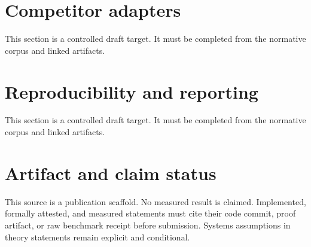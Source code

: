 \documentclass[11pt]{article}
\begin{document}
\section{Competitor adapters}
This section is a controlled draft target. It must be completed from the normative corpus and linked artifacts.

\section{Reproducibility and reporting}
This section is a controlled draft target. It must be completed from the normative corpus and linked artifacts.

\section*{Artifact and claim status}
This source is a publication scaffold. No measured result is claimed. Implemented,
formally attested, and measured statements must cite their code commit, proof
artifact, or raw benchmark receipt before submission. Systems assumptions in
theory statements remain explicit and conditional.
\end{document}
